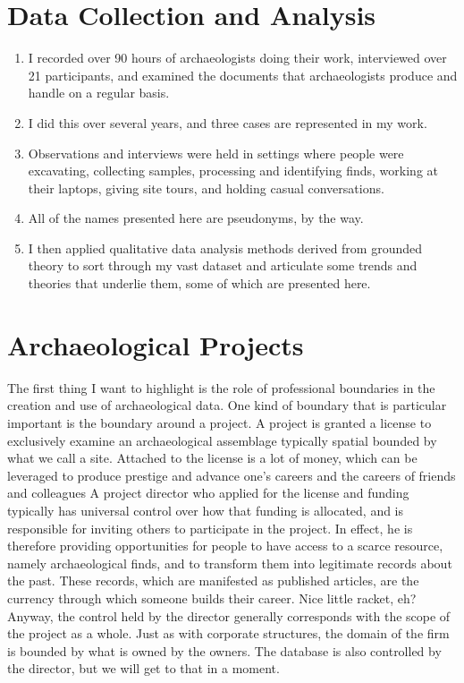 \documentclass{article}
\begin{document}
\section{Data Collection and Analysis}
\begin{enumerate}
  \item I recorded over 90 hours of archaeologists doing their work, interviewed over 21 participants, and examined the documents that archaeologists produce and handle on a regular basis.
  \item I did this over several years, and three cases are represented in my work.
  \item Observations and interviews were held in settings where people were excavating, collecting samples, processing and identifying finds, working at their laptops, giving site tours, and holding casual conversations.
  \item All of the names presented here are pseudonyms, by the way.
  \item I then applied qualitative data analysis methods derived from grounded theory to sort through my vast dataset and articulate some trends and theories that underlie them, some of which are presented here.
\end{enumerate}

\section{Archaeological Projects}
The first thing I want to highlight is the role of professional boundaries in the creation and use of archaeological data.
One kind of boundary that is particular important is the boundary around a project.
A project is granted a license to exclusively examine an archaeological assemblage typically spatial bounded by what we call a site.
Attached to the license is a lot of money, which can be leveraged to produce prestige and advance one's careers and the careers of friends and colleagues
A project director who applied for the license and funding typically has universal control over how that funding is allocated, and is responsible for inviting others to participate in the project.
In effect, he is therefore providing opportunities for people to have access to a scarce resource, namely archaeological finds, and to transform them into legitimate records about the past.
These records, which are manifested as published articles, are the currency through which someone builds their career.
Nice little racket, eh?
Anyway, the control held by the director generally corresponds with the scope of the project as a whole.
Just as with corporate structures, the domain of the firm is bounded by what is owned by the owners.
The database is also controlled by the director, but we will get to that in a moment.
\end{document}
